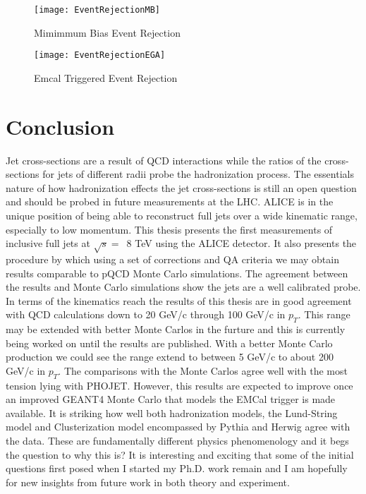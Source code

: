 \begin{figure}[!tbp]
  \centering
  \begin{minipage}[b]{0.4\textwidth}
    \texttt{[image: EventRejectionMB]}
    \caption{Mimimmum Bias Event Rejection}
  \end{minipage}
  \hfill
  \begin{minipage}[b]{0.49\textwidth}
    \texttt{[image: EventRejectionEGA]}
    \caption{Emcal Triggered Event Rejection}
  \end{minipage}
\end{figure}

\fi

\section{Conclusion}

Jet cross-sections are a result of QCD interactions while the ratios of the cross-sections for jets of different radii probe the hadronization process.  The essentials nature of how hadronization effects the jet cross-sections is still an open question and should be probed in future measurements at the LHC.  ALICE is in the unique position of being able to reconstruct full jets over a wide kinematic range, especially to low momentum.  
This thesis presents the first measurements of inclusive full jets at $\sqrt{s} = \,$ 8 TeV using the ALICE detector.  It also presents the procedure by which using a set of corrections and QA criteria we may obtain results comparable to pQCD Monte Carlo simulations.  The agreement between the results and Monte Carlo simulations show the jets are a well calibrated probe.  In terms of the kinematics reach the results of this thesis are in good agreement with QCD calculations down to 20 GeV/c through 100 GeV/c in $p_{T}$.  This range may be extended with better Monte Carlos in the furture and this is currently being worked on until the results are published.  With a better Monte Carlo production we could see the range extend to between 5 GeV/c to about 200 GeV/c in $p_{T}$.  The comparisons with the Monte Carlos agree well with the most tension lying with PHOJET.  However, this results are expected to improve once an improved GEANT4 Monte Carlo that models the EMCal trigger is made available.  It is striking how well both hadronization models, the Lund-String model and Clusterization model encompassed by Pythia and Herwig agree with the data.  These are fundamentally different physics phenomenology and it begs the question to why this is?   It is interesting and exciting that some of the initial questions first posed when I started my Ph.D. work remain and I am hopefully for new insights from future work in both theory and experiment.  

